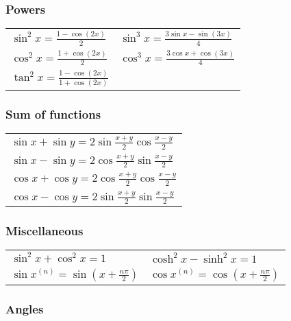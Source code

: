 \documentclass[a4paper, 10pt]{article}
\theoremstyle{definition}
\begin{document}
\subsubsection*{Powers}
\begin{tabularx}{\linewidth}{XX}
    $\sin^2 x = \frac{1 - \cos(2x)}{2}$ & $\sin^3 x = \frac{3 \sin x - \sin(3x)}{4}$ \\
    $\cos^2 x = \frac{1 + \cos(2x)}{2}$ & $\cos^3 x = \frac{3 \cos x + \cos(3x)}{4}$ \\
    $\tan^2 x = \frac{1 - \cos(2x)}{1 + \cos(2x)}$
\end{tabularx}

\subsubsection*{Sum of functions}
\begin{tabularx}{\linewidth}{X}
    $\sin x + \sin y = 2 \sin\frac{x + y}{2} \cos\frac{x - y}{2}$ \\
    $\sin x - \sin y = 2 \cos\frac{x + y}{2} \sin\frac{x - y}{2}$ \\
    $\cos x + \cos y = 2 \cos\frac{x + y}{2} \cos\frac{x - y}{2}$ \\
    $\cos x - \cos y = 2 \sin\frac{x + y}{2} \sin\frac{x - y}{2}$
\end{tabularx}

\subsubsection*{Miscellaneous}
\begin{tabularx}{\linewidth}{XX}
    $\sin^2 x + \cos^2 x = 1$ & $\cosh^2 x - \sinh^2 x = 1$ \\
    $\sin x^{(n)} = \sin\left(x + \frac{n \pi}{2}\right)$ & $\cos x^{(n)} = \cos\left(x + \frac{n \pi}{2}\right)$ \\
\end{tabularx}

\subsubsection*{Angles}
\end{document}
